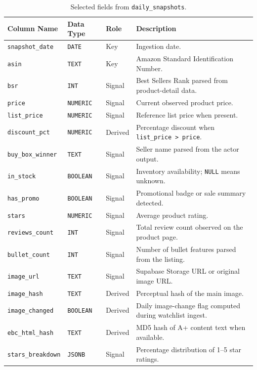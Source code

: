 \begin{table}[H]
  \centering
  \small
  \begin{tabular}{p{3.2cm}l@{\hspace{6pt}}l@{\hspace{6pt}}p{5.8cm}}
    \toprule
    \textbf{Column Name} & \textbf{Data Type} & \textbf{Role} & \textbf{Description} \\
    \midrule
    \texttt{snapshot\_date} & \texttt{DATE} & Key & Ingestion date. \\
    \texttt{asin} & \texttt{TEXT} & Key & Amazon Standard Identification Number. \\
    \texttt{bsr} & \texttt{INT} & Signal & Best Sellers Rank parsed from product-detail data. \\
    \texttt{price} & \texttt{NUMERIC} & Signal & Current observed product price. \\
    \texttt{list\_price} & \texttt{NUMERIC} & Signal & Reference list price when present. \\
    \texttt{discount\_pct} & \texttt{NUMERIC} & Derived & Percentage discount when \texttt{list\_price > price}. \\
    \texttt{buy\_box\_winner} & \texttt{TEXT} & Signal & Seller name parsed from the actor output. \\
    \texttt{in\_stock} & \texttt{BOOLEAN} & Signal & Inventory availability; \texttt{NULL} means unknown. \\
    \texttt{has\_promo} & \texttt{BOOLEAN} & Signal & Promotional badge or sale summary detected. \\
    \texttt{stars} & \texttt{NUMERIC} & Signal & Average product rating. \\
    \texttt{reviews\_count} & \texttt{INT} & Signal & Total review count observed on the product page. \\
    \texttt{bullet\_count} & \texttt{INT} & Signal & Number of bullet features parsed from the listing. \\
    \texttt{image\_url} & \texttt{TEXT} & Signal & Supabase Storage URL or original image URL. \\
    \texttt{image\_hash} & \texttt{TEXT} & Derived & Perceptual hash of the main image. \\
    \texttt{image\_changed} & \texttt{BOOLEAN} & Derived & Daily image-change flag computed during watchlist ingest. \\
    \texttt{ebc\_html\_hash} & \texttt{TEXT} & Derived & MD5 hash of A+ content text when available. \\
    \texttt{stars\_breakdown} & \texttt{JSONB} & Signal & Percentage distribution of 1--5 star ratings. \\
    \bottomrule
  \end{tabular}
  \caption{Selected fields from \texttt{daily\_snapshots}.}
  \label{tab:schema_daily_snapshots}
\end{table}

